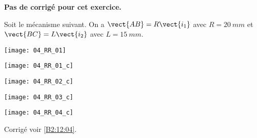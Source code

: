 \normaltrue
\correctiontrue


\setcounter{question}{0}
\ifcorrection
\else
\textbf{Pas de corrigé pour cet exercice.}
\fi

\ifprof
\else
Soit le mécanisme suivant. On a $\vect{AB}=R\vect{i_1}$ avec $R=\SI{20}{mm}$ et  
$\vect{BC}=L\vect{i_2}$ avec $L=\SI{15}{mm}$.
\begin{center}
\texttt{[image: 04\_RR\_01]}
\end{center}
\fi

\ifprof
\begin{center}
\texttt{[image: 04\_RR\_01\_c]}
\end{center}
\else
\fi


\ifprof
\begin{multicols}{3}
\else
\fi

\ifprof
\begin{center}
\texttt{[image: 04\_RR\_02\_c]}
\end{center}
\else
\fi

\ifprof
\begin{center}
\texttt{[image: 04\_RR\_03\_c]}
\end{center}
\else
\fi


\ifprof
\begin{center}
\texttt{[image: 04\_RR\_04\_c]}
\end{center}
\else
\fi

\ifprof
\end{multicols}
\else
\fi

\ifprof
\else
\begin{flushright}
\footnotesize{Corrigé  voir \ref{B2:12:04}.}
\end{flushright}%
\fi
